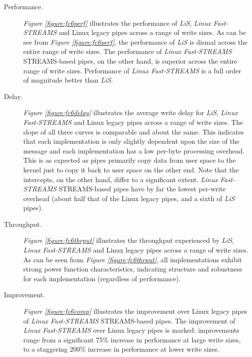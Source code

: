 \documentclass[letterpaper,final,notitlepage,twocolumn,10pt,twoside]{article}
\begin{document}
\begin{description}

\item[Performance.]

\textit{Figure \ref{figure:fc6perf}} illustrates
the performance of \textsl{LiS}, \textsl{Linux Fast-STREAMS} and Linux legacy
pipes across a range of write sizes.  As can be see from \textit{Figure
\ref{figure:fc6perf}}, the performance of \textsl{LiS} is dismal across the
entire range of write sizes.  The performance of \textsl{Linux Fast-STREAMS}
STREAMS-based pipes, on the other hand, is superior across the entire range of
write sizes.
Performance of \textsl{Linux Fast-STREAMS} is a full order of magnitude better
than \textsl{LiS}.

\item[Delay.]

\textit{Figure \ref{figure:fc6delay}}
illustrates the average write delay for \textsl{LiS}, \textsl{Linux
Fast-STREAMS} and Linux legacy pipes across a range of write sizes.  The slope
of all three curves is comparable and about the same.  This indicates that
each implementation is only slightly dependent upon the size of the message
and each implementation has a low per-byte processing overhead.  This is as
expected as pipes primarily copy data from user space to the kernel just to
copy it back to user space on the other end.  Note that the intercepts, on the
other hand, differ to a significant extent.  \textsl{Linux Fast-STREAMS}
STREAMS-based pipes have by far the lowest per-write overhead (about half that
of the Linux legacy pipes, and a sixth of \textsl{LiS} pipes).

\item[Throughput.]

\textit{Figure \ref{figure:fc6thrput}}
illustrates the throughput experienced by \textsl{LiS}, \textsl{Linux
Fast-STREAMS} and Linux legacy pipes across a range of write sizes.  As can be
seen from \textit{Figure \ref{figure:fc6thrput}}, all implementations exhibit
strong power function characteristics, indicating structure and robustness for
each implementation (regardless of performance).

\item[Improvement.]

\textit{Figure \ref{figure:fc6comp}} illustrates
the improvement over Linux legacy pipes of \textsl{Linux Fast-STREAMS}
STREAMS-based pipes.  The improvement of \textsl{Linux Fast-STREAMS} over
Linux legacy pipes is marked: improvements range from a significant 75\%
increase in performance at large write sizes, to a staggering 200\% increase
in performance at lower write sizes.

\end{description}
\end{document}
